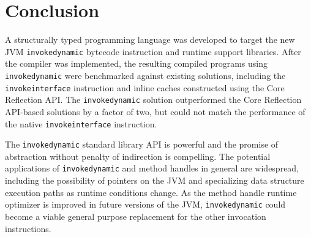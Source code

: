 \chapter{Conclusion}
\label{chapter:Conclusion}
\lhead{ \leftmark }

A structurally typed programming language was developed to target the new JVM \texttt{invokedynamic} bytecode instruction and runtime support libraries.  After the compiler was implemented, the resulting compiled programs using \texttt{invokedynamic} were benchmarked against existing solutions, including the \texttt{invokeinterface} instruction and inline caches constructed using the Core Reflection API.  The \texttt{invokedynamic} solution outperformed the Core Reflection API-based solutions by a factor of two, but could not match the performance of the native \texttt{invokeinterface} instruction.

The \texttt{invokedynamic} standard library API is powerful and the promise of abstraction without penalty of indirection is compelling.  The potential applications of \texttt{invokedynamic} and method handles in general are widespread, including the possibility of pointers on the JVM and specializing data structure execution paths as runtime conditions change.  As the method handle runtime optimizer is improved in future versions of the JVM, \texttt{invokedynamic} could become a viable general purpose replacement for the other invocation instructions.

